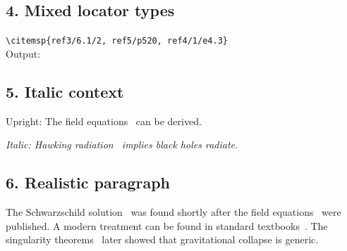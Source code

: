 \documentclass[11pt, a4paper]{article}
\begin{document}
\subsection*{4. Mixed locator types}

\noindent
\verb|\citemsp{ref3/6.1/2, ref5/p520, ref4/1/e4.3}|\\
Output: 

\subsection*{5. Italic context}

\noindent
Upright: The field equations~ can be derived.

\medskip\noindent
\textit{Italic: Hawking radiation~ implies black holes radiate.}

\subsection*{6. Realistic paragraph}

The Schwarzschild solution~ was found shortly after the
field equations~ were published. A modern treatment can be
found in standard textbooks~. The
singularity theorems~ later showed that
gravitational collapse is generic.



\end{document}

